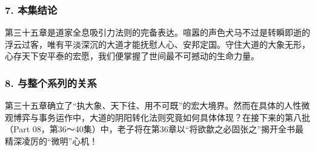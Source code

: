 \subsubsection{7. 本集结论}
第三十五章是道家全息吸引力法则的完备表达。喧嚣的声色犬马不过是转瞬即逝的浮云过客，唯有平淡深沉的大道才能抚慰人心、安邦定国。守住大道的大象无形，心存天下安平泰的宏愿，我们便掌握了世间最不可撼动的生命力量。

\subsubsection{8. 与整个系列的关系}
第三十五章确立了“执大象、天下往、用不可既”的宏大境界。然而在具体的人性微观博弈与事务运作中，大道的阴阳转化法则究竟如何具体体现？在接下来的第八批（Part 08，第36～40集）中，老子将在第36章以“将欲歙之必固张之”揭开全书最精深凌厉的“微明”心机！